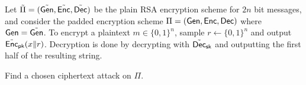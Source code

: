 \documentclass[a4paper,10pt,landscape,twocolumn]{scrartcl}
\begin{document}
\begin{exercise}
	Let $\tilde \Pi=(\tilde{\mathsf{Gen}}, \tilde {\mathsf{Enc}}, \tilde {\mathsf{Dec}})$ be the plain RSA encryption scheme for $2 n$ bit messages, and consider the
	padded encryption scheme $\Pi=(\mathsf{Gen}, \mathsf{Enc}, \mathsf{Dec})$ where $\mathsf{Gen}=\tilde{\mathsf{Gen}}$. To encrypt a plaintext $m\in\{0,1\}^n$, sample $r\gets\{0,1\}^n$ and output $\tilde {\mathsf{Enc}}_{\mathsf{pk}}(x\|r)$. Decryption is done by decrypting with $\tilde{\mathsf{Dec}}_{\mathsf{sk}}$ and outputting the first half of the resulting string.
	\begin{subex}
		Find a chosen ciphertext attack on $\Pi$.
	\end{subex}
\end{exercise}
\end{document}
